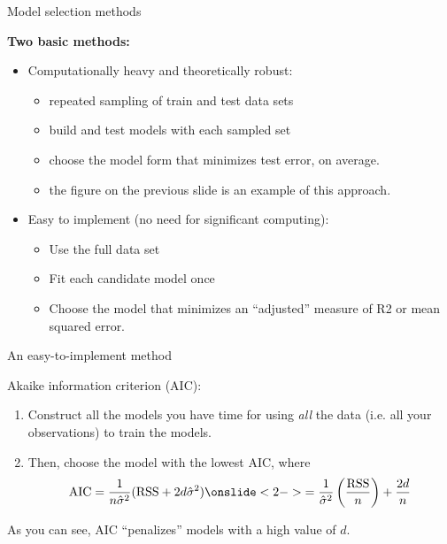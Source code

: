 \documentclass[aspectratio=169]{beamer}
\begin{document}
\begin{frame}{Model selection methods}

\textbf{Two basic methods:}
\vspace{5mm}
\begin{itemize}
\item Computationally heavy and theoretically robust: 
\begin{itemize}
\item repeated sampling of train and test data sets
\item build and test models with each sampled set
\item choose the model form that minimizes test error, on average.
\item the figure on the previous slide is an example of this approach.
\end{itemize}
\vspace{5mm}
\item Easy to implement (no need for significant computing):
\begin{itemize}
\item Use the full data set
\item Fit each candidate model once
\item Choose the model that minimizes an ``adjusted'' measure of R2 or mean squared error.
\end{itemize}
\end{itemize}
\end{frame}

\begin{frame}{An easy-to-implement method}

Akaike information criterion (AIC):

\begin{enumerate}
\item Construct all the models you have time for using \textit{all} the data (i.e. all your observations) to train the models.
\item Then, choose the model with the lowest AIC, where
\begin{align*}
\text{AIC} = \frac{1}{n\hat{\sigma}^2}(\text{RSS}+2d\hat{\sigma}^2) \onslide<2->{= \frac{1}{\hat{\sigma}^2}\left(\frac{\text{RSS}}{n}\right) + \frac{2d}{n}}
\end{align*}
\end{enumerate}

\pause
As you can see, AIC ``penalizes'' models with a high value of $d$.  
\end{frame}
\end{document}
